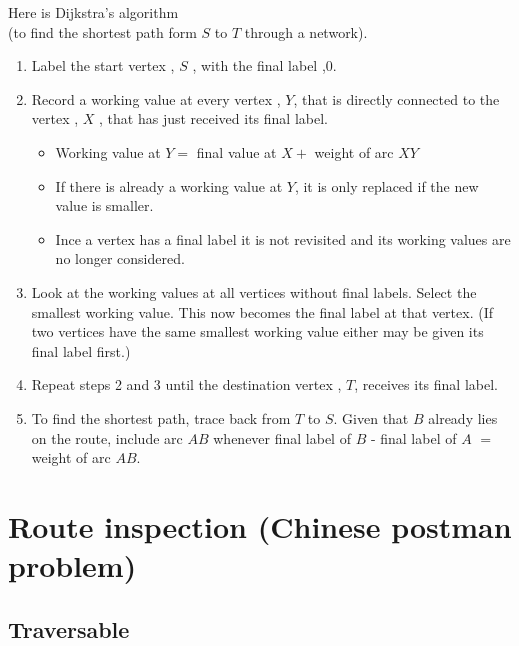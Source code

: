 \documentclass[a4paper]{article}
\begin{document}
\begin{defi}
Here is Dijkstra's algorithm\\
(to find the shortest path form $S$ to $T$ through a network).
\begin{enumerate}
\item Label the start vertex , $S$ , with the final label ,$0$.
\item Record a working value at every vertex , $Y$, that is directly connected to the vertex , $X$ , that has just received its final label.
\begin{itemize}
\item Working value at $Y=$ final value at $X+$ weight of arc $XY$
\item If there is already a working value at $Y$, it is only replaced if the new value is smaller.
\item Ince a vertex has a final label it is not revisited and its working values are no longer considered.
\end{itemize}
\item Look at the working values at all vertices without final labels. Select the smallest working value. This now becomes the final label at that vertex. (If two vertices have the same smallest working  value either may be given its final label first.)
\item Repeat steps 2 and 3 until the destination vertex , $T$, receives its final label.
\item To find the shortest path, trace back from $T$ to $S$. Given that $B$ already lies on the route, include arc $AB$ whenever final label of $B$ - final label of $A$ $=$ weight of arc $AB$. 
\end{enumerate}
\end{defi}
\begin{eg}

\end{eg}
\begin{eg}

\end{eg}
\begin{eg}

\end{eg}

\section{Route inspection (Chinese postman problem)}

\subsection{Traversable}
\end{document}
